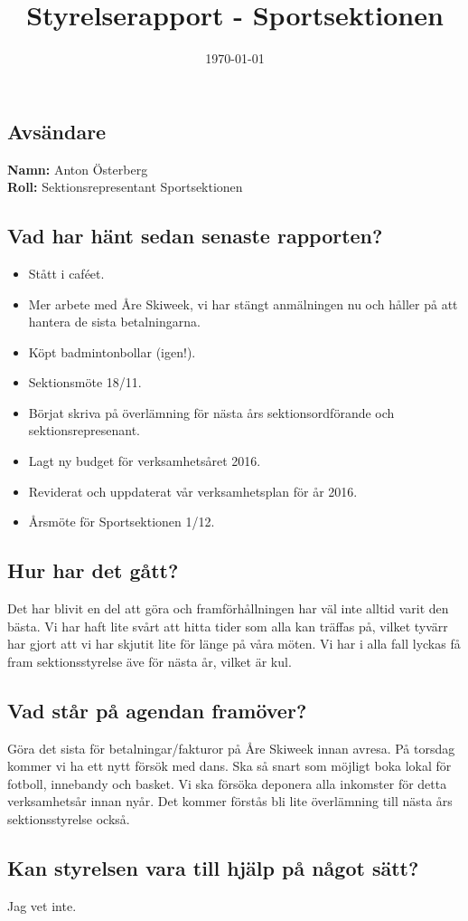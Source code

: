 \documentclass[a4paper]{article}
\begin{document}
	\title{Styrelserapport - Sportsektionen}
	\date{\today}
	\maketitle

	\subsection{Avsändare}
		\textbf{Namn:} Anton Österberg\\
		\textbf{Roll:} Sektionsrepresentant Sportsektionen\\
	\subsection{Vad har hänt sedan senaste rapporten?}
	\begin{itemize}
		\item Stått i caféet.
		\item Mer arbete med Åre Skiweek, vi har stängt anmälningen nu och håller på att hantera de sista betalningarna.
		\item Köpt badmintonbollar (igen!).
		\item Sektionsmöte 18/11.
		\item Börjat skriva på överlämning för nästa års sektionsordförande och sektionsrepresenant.
		\item Lagt ny budget för verksamhetsåret 2016.
		\item Reviderat och uppdaterat vår verksamhetsplan för år 2016.
		\item Årsmöte för Sportsektionen 1/12.
	\end{itemize}
	\subsection{Hur har det gått?}
	Det har blivit en del att göra och framförhållningen har väl inte alltid varit den bästa. Vi har haft lite svårt att hitta tider som alla kan träffas på, vilket tyvärr har gjort att vi har skjutit lite för länge på våra möten. Vi har i alla fall lyckas få fram sektionsstyrelse äve för nästa år, vilket är kul.
	\subsection{Vad står på agendan framöver?}
	Göra det sista för betalningar/fakturor på Åre Skiweek innan avresa. På torsdag kommer vi ha ett nytt försök med dans. Ska så snart som möjligt boka lokal för fotboll, innebandy och basket. Vi ska försöka deponera alla inkomster för detta verksamhetsår innan nyår. Det kommer förstås bli lite överlämning till nästa års sektionsstyrelse också.
	\subsection{Kan styrelsen vara till hjälp på något sätt?}
	Jag vet inte.
\end{document}
